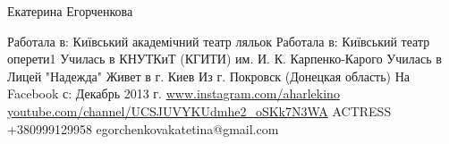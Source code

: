  
 
 
 
 

Екатерина Егорченкова
\par
Работала в: Київський академічний театр ляльок
Работала в: Київський театр оперети1
Училась в КНУТКиТ (КГИТИ) им. И. К. Карпенко-Карого
Училась в Лицей "Надежда"
Живет в г. Киев
Из г. Покровск (Донецкая область)
На Facebook с: Декабрь 2013 г.
\url{www.instagram.com/aharlekino}
\url{youtube.com/channel/UCSJUVYKUdmhe2_oSKk7N3WA}
ACTRESS +380999129958 egorchenkovakatetina@gmail.com
